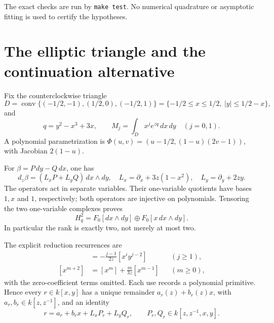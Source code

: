 \documentclass[11pt]{article}
\numberwithin{equation}{section}
\theoremstyle{definition}
\theoremstyle{remark}
\newcommand{\dd}{\,d}
\newcommand{\Hq}{H_q^2}
\begin{document}
The exact checks are run by \texttt{make test}. No numerical quadrature
or asymptotic fitting is used to certify the hypotheses.

\section{The elliptic triangle and the continuation alternative}\label{sec:elliptic-example}
Fix the counterclockwise triangle
\[
 D=\operatorname{conv}\{(-1/2,-1),(1/2,0),(-1/2,1)\}
 =\{-1/2\le x\le1/2,\ |y|\le1/2-x\},
\]
and
\[
 q=y^2-x^3+3x,\qquad
 M_j=\int_Dx^j e^{zq}\dd x\dd y\quad(j=0,1).
\]
A polynomial parametrization is
$\Phi(u,v)=(u-1/2,(1-u)(2v-1))$, with Jacobian $2(1-u)$.

For $\beta=P\,dy-Q\,dx$, one has
\[
 d_z\beta=(L_xP+L_yQ)\,dx\wedge dy,
\quad L_x=\partial_x+3z(1-x^2),\quad L_y=\partial_y+2zy.
\]
The operators act in separate variables. Their one-variable quotients have
bases $1,x$ and $1$, respectively; both operators are injective on
polynomials. Tensoring the two one-variable complexes proves
\begin{equation}\label{eq:ranktwo}
 \Hq=F_0[dx\wedge dy]\oplus F_0[x\,dx\wedge dy].
\end{equation}
In particular the rank is exactly two, not merely at most two.

The explicit reduction recurrences are
\begin{align}
 [x^i y^j]&=-\frac{j-1}{2z}[x^i y^{j-2}] &&(j\ge1),\label{eq:yrec}\\
 [x^{m+2}]&=[x^m]+\frac{m}{3z}[x^{m-1}] &&(m\ge0),\label{eq:xrec}
\end{align}
with the zero-coefficient terms omitted. Each use records a polynomial
primitive. Hence every $r\in k[x,y]$ has a unique remainder
$a_r(z)+b_r(z)x$, with $a_r,b_r\in k[z,z^{-1}]$, and an identity
\begin{equation}\label{eq:elliptic-normal}
 r=a_r+b_rx+L_xP_r+L_yQ_r,
 \qquad P_r,Q_r\in k[z,z^{-1},x,y].
\end{equation}
\end{document}
